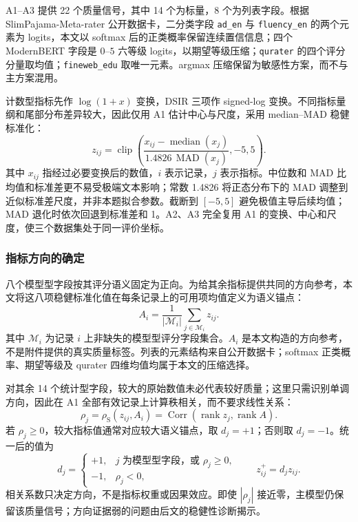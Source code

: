 A1--A3 提供 22 个质量信号，其中 14 个为标量，8 个为列表字段。根据 SlimPajama-Meta-rater 公开数据卡\cite{metaraterdata}，二分类字段 \texttt{ad\_en} 与 \texttt{fluency\_en} 的两个元素为 logits，本文以 softmax 后的正类概率保留连续置信信息；四个 ModernBERT 字段是 $0$--$5$ 六等级 logits，以期望等级压缩；\texttt{qurater} 的四个评分分量取均值；\texttt{fineweb\_edu} 取唯一元素。argmax 压缩保留为敏感性方案，而不与主方案混用。

计数型指标先作 $\log(1+x)$ 变换，DSIR 三项作 signed-log 变换。不同指标量纲和尾部分布差异较大，因此仅用 A1 估计中心与尺度，采用 median--MAD 稳健标准化：
\begin{equation}
z_{ij}
=
\operatorname{clip}\!\left(
\frac{x_{ij}-\operatorname{median}(x_j)}
{1.4826\,\operatorname{MAD}(x_j)},
-5,5
\right).
\label{eq:q1_robust_z}
\end{equation}
其中 $x_{ij}$ 指经过必要变换后的数值，$i$ 表示记录，$j$ 表示指标。中位数和 MAD 比均值和标准差更不易受极端文本影响；常数 1.4826 将正态分布下的 MAD 调整到近似标准差尺度，并非本题拟合参数。截断到 $[-5,5]$ 避免极值主导后续均值；MAD 退化时依次回退到标准差和 1。A2、A3 完全复用 A1 的变换、中心和尺度，使三个数据集处于同一评价坐标。

\subsubsection{指标方向的确定}

八个模型型字段按其评分语义固定为正向。为给其余指标提供共同的方向参考，本文将这八项稳健标准化值在每条记录上的可用项均值定义为语义锚点：
\begin{equation}
A_i=\frac{1}{|\mathcal M_i|}\sum_{j\in\mathcal M_i}z_{ij}.
\label{eq:q1_quality_anchor}
\end{equation}
其中 $\mathcal M_i$ 为记录 $i$ 上非缺失的模型型评分字段集合。$A_i$ 是本文构造的方向参考，不是附件提供的真实质量标签。列表的元素结构来自公开数据卡；softmax 正类概率、期望等级及 qurater 四维均值均属于本文的压缩选择。

对其余 14 个统计型字段，较大的原始数值未必代表较好质量；这里只需识别单调方向，因此在 A1 全部有效记录上计算秩相关，而不要求线性关系：
\begin{equation}
\rho_j=\rho_{\mathrm S}(z_{ij},A_i)
=\operatorname{Corr}(\operatorname{rank}z_j,\operatorname{rank}A).
\label{eq:q1_orientation_rho}
\end{equation}
若 $\rho_j\ge0$，较大指标值通常对应较大语义锚点，取 $d_j=+1$；否则取 $d_j=-1$。统一后的值为
\begin{equation}
d_j=\begin{cases}+1,&j\text{ 为模型型字段，或 }\rho_j\ge0,\\-1,&\rho_j<0,\end{cases}
\qquad z^+_{ij}=d_jz_{ij}.
\label{eq:q1_orientation_freeze}
\end{equation}
相关系数只决定方向，不是指标权重或因果效应。即使 $|\rho_j|$ 接近零，主模型仍保留该质量信号；方向证据弱的问题由后文的稳健性诊断揭示。

